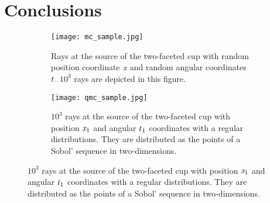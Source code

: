 \section{Conclusions}
\begin{figure}[h]
    \centering
 \begin{subfigure}[t]{0.48\textwidth}

    \texttt{[image: mc\_sample.jpg]}
    \caption{Rays at the source of the two-faceted cup with random position coordinate $\textit{x}$ and random angular coordinates $t$. $10^3$ rays are depicted in this figure.}
    \label{fig:mc_sample}

\end{subfigure}
\hfill
\begin{subfigure}[t]{0.48\textwidth}

    \texttt{[image: qmc\_sample.jpg]}
    \caption{$10^3$ rays at the source of the two-faceted cup with position $\textit{x}_1$ and angular $t_1$ coordinates with a regular distributions.
They are distributed as the points of a Sobol' sequence in two-dimensions.}
    \label{fig:qmc_sample}

\end{subfigure}
\end{figure}



